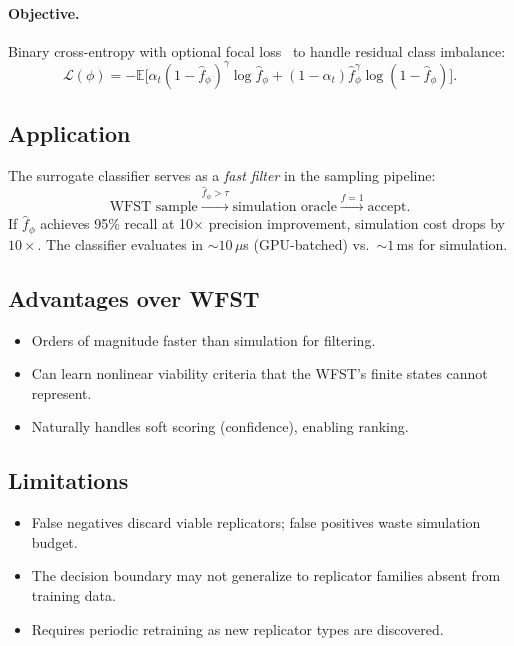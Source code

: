 \documentclass{article}
\begin{document}
\paragraph{Objective.}
Binary cross-entropy with optional focal loss~\cite{lin2017focal} to handle
residual class imbalance:
\begin{equation}
  \mathcal{L}(\phi) = -\mathbb{E}\bigl[
    \alpha_t (1 - \hat{f}_\phi)^\gamma \log \hat{f}_\phi
    + (1 - \alpha_t) \hat{f}_\phi^\gamma \log(1 - \hat{f}_\phi)
  \bigr].
\end{equation}

\subsection{Application}

The surrogate classifier serves as a \emph{fast filter} in the sampling
pipeline:
\begin{equation}
  \text{WFST sample} \xrightarrow{\hat{f}_\phi > \tau}
  \text{simulation oracle} \xrightarrow{f=1} \text{accept}.
\end{equation}
If $\hat{f}_\phi$ achieves 95\% recall at 10$\times$ precision improvement,
simulation cost drops by $10\times$.  The classifier evaluates in
${\sim}10\,\mu$s (GPU-batched) vs.\ ${\sim}1$\,ms for simulation.

\subsection{Advantages over WFST}

\begin{itemize}
  \item Orders of magnitude faster than simulation for filtering.
  \item Can learn nonlinear viability criteria that the WFST's finite
        states cannot represent.
  \item Naturally handles soft scoring (confidence), enabling ranking.
\end{itemize}

\subsection{Limitations}

\begin{itemize}
  \item False negatives discard viable replicators; false positives waste
        simulation budget.
  \item The decision boundary may not generalize to replicator families
        absent from training data.
  \item Requires periodic retraining as new replicator types are discovered.
\end{itemize}
\end{document}
